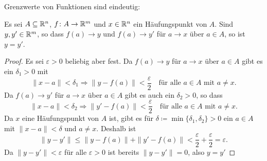 \documentclass[a4paper,10pt]{article}
\begin{document}
Grenzwerte von Funktionen sind eindeutig:


\begin{lem}
 Es sei $A \subseteq \mathbb{R}^n$, $f \colon A \to \mathbb{R}^m$ und $x \in \mathbb{R}^n$ ein Häufungspunkt von $A$. Sind $y, y' \in \mathbb{R}^m$, so dass $f(a) \to y$ und $f(a) \to y'$ für $a \to x$ über $a \in A$, so ist $y = y'$.
\end{lem}
\begin{proof}
 Es sei $\varepsilon > 0$ beliebig aber fest. Da $f(a) \to y$ für $a \to x$ über $a \in A$ gibt es ein $\delta_1 > 0$ mit
 \[
  \|x-a\| < \delta_1 \Rightarrow \|y-f(a)\| < \frac{\varepsilon}{2}
  \quad \text{für alle $a \in A$ mit $a \neq x$}.
 \]
 Da $f(a) \to y'$ für $a \to x$ über $a \in A$ gibt es auch ein $\delta_2 > 0$, so dass
 \[
  \|x-a\| < \delta_2 \Rightarrow \|y'-f(a)\| < \frac{\varepsilon}{2}
  \quad \text{für alle $a \in A$ mit $a \neq x$}.
 \]
 Da $x$ eine Häufungspunkt von $A$ ist, gibt es für $\delta \coloneqq \min \{\delta_1, \delta_2\} > 0$ ein $a \in A$ mit $\|x-a\| < \delta$ und $a \neq x$. Deshalb ist
 \[
  \|y-y'\|
  \leq \|y-f(a)\| + \|y'-f(a)\|
  < \frac{\varepsilon}{2} + \frac{\varepsilon}{2}
  = \varepsilon.
 \]
 Da $\|y-y'\| < \varepsilon$ für alle $\varepsilon > 0$ ist bereits $\|y-y'\| = 0$, also $y = y'$
\end{proof}


\end{document}
